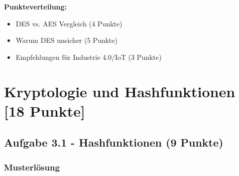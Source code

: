 \documentclass[12pt,a4paper]{article}
\begin{document}
\textbf{Punkteverteilung:}
\begin{itemize}
    \item DES vs. AES Vergleich (4 Punkte) \checkmark
    \item Warum DES unsicher (5 Punkte) \checkmark
    \item Empfehlungen für Industrie 4.0/IoT (3 Punkte) \checkmark
\end{itemize}


\newpage

\section{Kryptologie und Hashfunktionen [18 Punkte]}

\subsection{Aufgabe 3.1 - Hashfunktionen (9 Punkte)}

\subsubsection*{Musterlösung}
\end{document}

